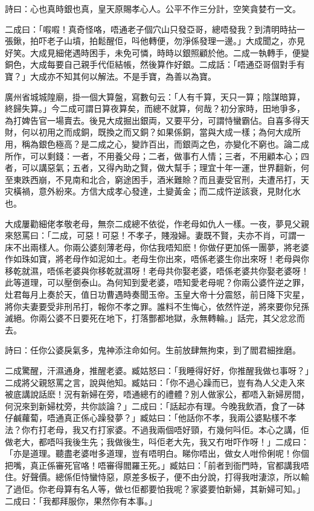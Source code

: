 \documentclass[a5paper, 12pt, openany]{book} %
\begin{document}
	詩曰：心也真時銀也真，皇天原賜孝心人。公平不作三分計，空笑貪婪冇一文。

	二成曰：「㗇㗇！真奇怪咯，唔通老子個穴山只發亞哥，總唔發我？到清明時拈一張鍬，拍吓老子山墳，拍鬆醒佢，呌他轉便，勿淨係發理一邊。」大成聞之，亦見好笑。大成見細佬遇時困手，未免可憐，時時以銀照顧於他。二成一執轉手，便變銅色，大成每要自己親手代佢結帳，然後算作好銀。二成話：「唔通亞哥個對手有寶？」大成亦不知其何以解法。不是手寶，為善以為寶。

	廣州省城城隍廟，掛一個大算盤，寫數句云：「人有千算，天只一算；陰謀暗算，終歸失算。」今二成可謂日算夜算矣，而總不就算，何哉？初分家時，田地爭多，為打婢告官一場賣去。後見大成掘出銀両，又要平分，可謂恃蠻霸佔。自喜多得天財，何以初用之而成銅，既換之而又銅？如果係銅，當與大成一樣；為何大成所用，稱為銀色極高？是二成之心，變詐百出，而銀両之色，亦變化不窮也。論二成所作，可以剩錢：一者，不用養父母；二者，做事冇人情；三者，不用顧本心；四者，可以講惡氣；五者，又得內助之賢，做大幫手；理宜十年一運，世界翻新，何至東跌西崩，不見南和北合，窮途困手，酒米難賒？而且妻受官刑，夫遭吊打，天灾橫禍，意外紛來。方信大成孝心發達，土變黃金；而二成忤逆該衰，見財化水也。

	大成屢勸細佬孝敬老母，無奈二成總不依從，作老母如仇人一樣。一夜，夢見父親來怒罵曰：「二成，可惡！可惡！不孝子，賤潑婦。妻既不賢，夫亦不肖，可謂一床不出兩樣人。你兩公婆刻薄老母，你估我唔知麽！你做仔更加係一團夢，將老婆作如珠如寶，將老母作如泥如土。老母生你出來，唔係老婆生你出來呀！老母與你移乾就濕，唔係老婆與你移乾就濕呀！老母共你娶老婆，唔係老婆共你娶老婆呀！此等道理，可以壓倒泰山。為何知到愛老婆，唔知愛老母呢？你兩公婆忤逆之罪，灶君每月上奏於天，值日功曹遇時奏聞玉帝。玉皇大帝十分震怒，前日降下灾星，將你夫妻要受非刑吊打，報你不孝之罪。誰料不生悔心，依然忤逆，將來要你兒孫滅絕。你兩公婆不日要死在地下，打落酆都地獄，永無轉輪。」話完，其父忿忿而去。

	詩曰：任你公婆戾氣多，鬼神添注命如何。生前放肆無拘束，到了閻君細挫磨。

	二成驚醒，汗濕通身，推醒老婆。臧姑怒曰：「我睡得好好，你推醒我做乜事呀？」二成將父親怒罵之言，說與他知。臧姑曰：「你不過心躁而已，豈有為人父走入來被底講說話麽！況有新婦在旁，唔通總冇的禮體？別人做家公，都唔入新婦房間，何況來到新婦枕旁，共你談論？」二成曰：「話起亦有理。今晚我飲酒，食了一砵仔鹹蘿蔔，唔通真正係心躁發夢？」臧姑曰：「他話你不孝，我兩公婆點樣不孝法？你冇打老母，我又冇打家婆。不過我兩個唔好頸，冇幾何呌佢。本心之講，佢做老大，都唔呌我後生先；我做後生，呌佢老大先，我又冇咁吓作呀！」二成曰：「亦是道理。聽盡老婆咁多道理，豈有唔明白。睇你唔出，做女人咁伶俐呢！你個把嘴，真正係審死官咯！唔審得閻羅王死。」臧姑曰：「前者到衙門時，官都講我唔住。好聲價。總係佢恃蠻恃惡，原差多板子，便不由分說，打得我咁淒涼，所以輸了過佢。你老母算有名人等，做乜佢都要怕我呢？家婆要怕新婦，其新婦可知。」二成曰：「我都拜服你，果然你有本事。」
\end{document}
